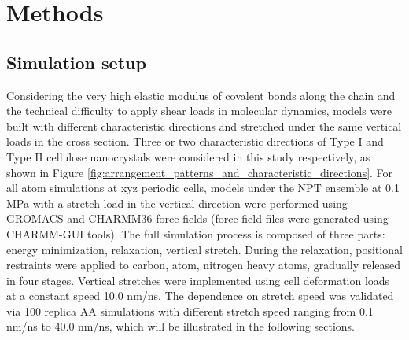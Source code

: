 \documentclass{article}
\begin{document}
\section*{Methods}
\addtocounter{section}{1}
\setcounter{subsection}{0}
\indent

\subsection{Simulation setup}\indent

Considering the very high elastic modulus of covalent bonds along the chain and the technical difficulty to apply shear loads in molecular dynamics, models were built with different characteristic directions and stretched under the same vertical loads in the cross section.
Three or two characteristic directions of Type I and Type II cellulose nanocrystals were considered in this study respectively, as shown in Figure \ref{fig:arrangement_patterns_and_characteristic_directions}.
For all atom simulations at xyz periodic cells, models under the NPT ensemble at 0.1 MPa with a stretch load in the vertical direction were performed using GROMACS\cite{abraham2015gromacs,bjelkmar2010implementation} and CHARMM36\cite{huang2013charmm36,huang2017charmm36m} force fields (force field files were generated using CHARMM-GUI tools\cite{jo2008charmm,lee2016charmm}).
The full simulation process is composed of three parts: energy minimization, relaxation, vertical stretch.
During the relaxation, positional restraints were applied to carbon, atom, nitrogen heavy atoms, gradually released in four stages.
Vertical stretches were implemented using cell deformation loads at a constant speed 10.0 nm/ns.
The dependence on stretch speed was validated via 100 replica AA simulations with different stretch speed ranging from 0.1 nm/ns to 40.0 nm/ns, which will be illustrated in the following sections.
\end{document}
